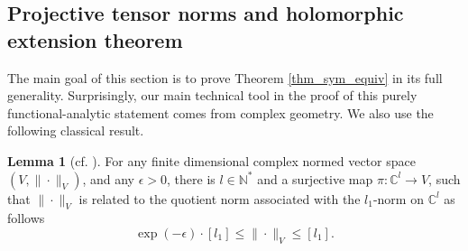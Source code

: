 \documentclass[12pt]{article}
\numberwithin{equation}{section}
\theoremstyle{theorem}
\theoremstyle{definition}
\newtheorem{lem}[thm]{Lemma}
\theoremstyle{remark}
\newcommand{\comp}{\mathbb{C}}
\newcommand{\nat}{\mathbb{N}}
\begin{document}
	\subsection{Projective tensor norms and holomorphic extension theorem}\label{sect_proj_t_ot}
	
	The main goal of this section is to prove Theorem \ref{thm_sym_equiv} in its full generality.
	Surprisingly, our main technical tool in the proof of this purely functional-analytic statement comes from complex geometry.
	We also use the following classical result.
	\begin{lem}[{cf. \cite[Lemma 2.2]{PolarConst}}]\label{lem_proj_fun_an}
		For any finite dimensional complex normed vector space $(V, \| \cdot \|_V)$, and any $\epsilon > 0$, there is $l \in \nat^*$ and a surjective map $\pi : \comp^l \to V$, such that $\| \cdot \|_V$ is related to the quotient norm associated with the $\textit{l}_1$-norm on $\comp^l$ as follows
		\begin{equation}\label{eq_proj_fun_an}
			\exp(-\epsilon) \cdot [\textit{l}_1] \leq \| \cdot \|_V \leq [\textit{l}_1].
		\end{equation}
	\end{lem}

\end{document}
